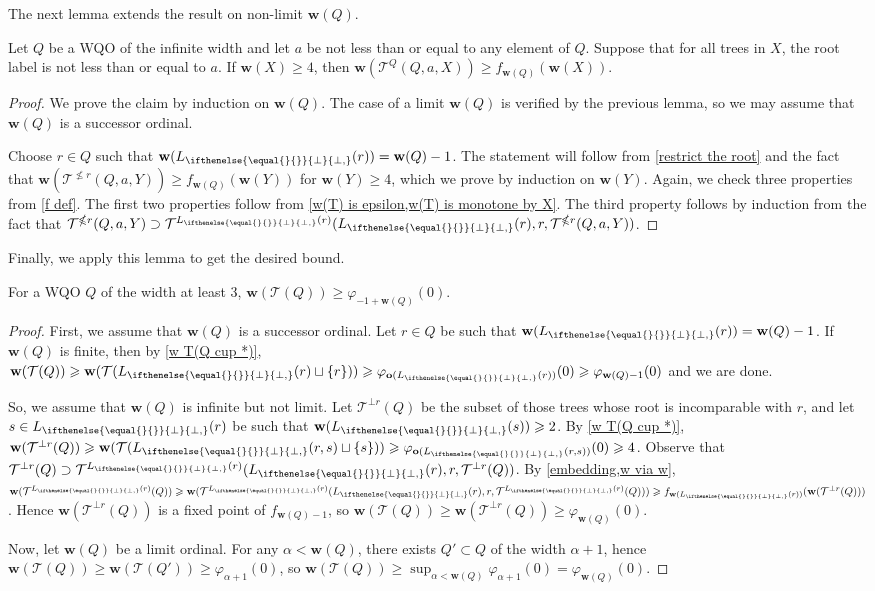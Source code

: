 \documentclass[runningheads]{llncs}
\let \nleq \nleqslant
\let \geq \geqslant
\let \phi \varphi
\newcommand \K [2][]{L_{\ifthenelse{\equal{#1}{}}{\bot}{\bot,#1}}(#2)}
\renewcommand \k [2][]{\w(\K[#1]{#2})}
\def \T {\mathcal{T}}
\def \o {\textbf{o}}
\def \w {\textbf{w}}
\begin{document}
The next lemma extends the result on non-limit $\w(Q)$.

\begin{lemma}\label{w via w}
    Let $Q$ be a WQO of the infinite width and let $a$ be not less than or equal to any element of $Q$.
    Suppose that for all trees in $X$, the root label is not less than or equal to $a$.
    If $\w(X) \geq 4$, then $\w(\T^Q(Q, a, X)) \geq f_{\w(Q)}(\w(X))$.
\end{lemma}
\begin{proof}
    We prove the claim by induction on $\w(Q)$. The case of a limit $\w(Q)$ is verified by the previous lemma, so we may assume that $\w(Q)$ is a successor ordinal.
    
    Choose $r \in Q$ such that $\k{r} = \w(Q)-1$. The statement will follow from \cref{restrict the root} and the fact that $\w(\T^{\nleq r}(Q, a, Y)) \geq f_{\w(Q)}(\w(Y))$ for $\w(Y) \geq 4$, which we prove by induction on $\w(Y)$. Again, we check three properties from \cref{f def}. The first two properties follow from \cref{w(T) is epsilon,w(T) is monotone by X}. The third property follows by induction from the fact that $\T^{\nleq r}(Q, a, Y) \supset \T^{\K{r}}(\K{r}, r, \T^{\nleq r}(Q, a, Y))$.
\end{proof}

Finally, we apply this lemma to get the desired bound.

\begin{theorem}
    For a WQO $Q$ of the width at least 3, $\w(\T(Q)) \geq \phi_{-1+\w(Q)}(0)$.
\end{theorem}
\begin{proof}
    First, we assume that $\w(Q)$ is a successor ordinal. Let $r \in Q$ be such that $\k{r} = \w(Q)-1$. If $\w(Q)$ is finite, then by \cref{w T(Q cup *)}, $\w(\T(Q)) \geq \w(\T(\K{r}\sqcup\{r\})) \geq \phi_{\o(\K{r})}(0) \geq \phi_{\w(Q)-1}(0)$ and we are done. 
    
    So, we assume that $\w(Q)$ is infinite but not limit. Let $\T^{\bot r}(Q)$ be the subset of those trees whose root is incomparable with $r$, and let $s \in \K{r}$ be such that $\k{s} \geq 2$. By \cref{w T(Q cup *)}, $\w(\T^{\bot r}(Q)) \geq \w(\T(\K{r,s}\sqcup\{s\})) \geq \phi_{\o(\K{r,s})}(0) \geq 4$. Observe that $\T^{\bot r}(Q) \supset \T^{\K{r}}(\K{r}, r, \T^{\bot r}(Q))$. By \cref{embedding,w via w}, $\w(\T^{\K{r}}(Q)) \geq \w(\T^{\K{r}}(\K{r}, r, \T^{\K{r}}(Q))) \geq f_{\k{r}}(\w(\T^{\bot r}(Q)))$. Hence $\w(\T^{\bot r}(Q))$ is a fixed point of $f_{\w(Q)-1}$, so $\w(\T(Q)) \geq \w(\T^{\bot r}(Q)) \geq \phi_{\w(Q)}(0)$.

    Now, let $\w(Q)$ be a limit ordinal. For any $\alpha < \w(Q)$, there exists $Q' \subset Q$ of the width $\alpha+1$, hence $\w(\T(Q)) \geq \w(\T(Q')) \geq \phi_{\alpha+1}(0)$, so $\w(\T(Q)) \geq \sup_{\alpha<\w(Q)} \phi_{\alpha+1}(0) = \phi_{\w(Q)}(0)$.
\end{proof}
\end{document}
